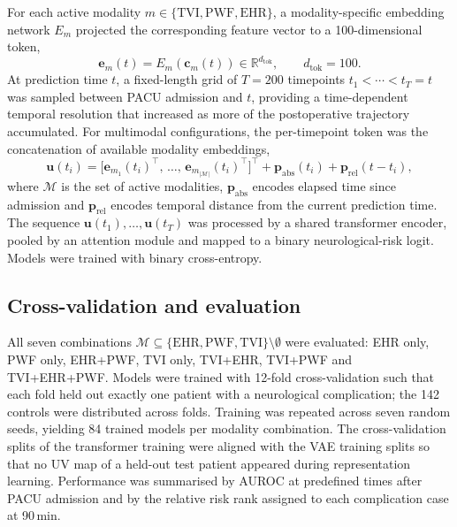 \documentclass[11pt]{article}
\begin{document}
For each active modality $m\in\{\mathrm{TVI},\mathrm{PWF},\mathrm{EHR}\}$, a modality-specific embedding network $E_{m}$ projected the corresponding feature vector to a 100-dimensional token,
\begin{equation}
  \label{eq:embed}
  \mathbf{e}_{m}(t)=E_{m}\!\left(\mathbf{c}_{m}(t)\right)\in\mathbb{R}^{d_{\mathrm{tok}}},\qquad d_{\mathrm{tok}}=100.
\end{equation}
At prediction time $t$, a fixed-length grid of $T=200$ timepoints $t_{1}<\cdots<t_{T}=t$ was sampled between PACU admission and $t$, providing a time-dependent temporal resolution that increased as more of the postoperative trajectory accumulated. For multimodal configurations, the per-timepoint token was the concatenation of available modality embeddings,
\begin{equation}
  \label{eq:token}
  \mathbf{u}(t_{i})=\bigl[\mathbf{e}_{m_{1}}(t_{i})^{\top},\,\ldots,\,\mathbf{e}_{m_{|\mathcal{M}|}}(t_{i})^{\top}\bigr]^{\top}+\mathbf{p}_{\mathrm{abs}}(t_{i})+\mathbf{p}_{\mathrm{rel}}(t-t_{i}),
\end{equation}
where $\mathcal{M}$ is the set of active modalities, $\mathbf{p}_{\mathrm{abs}}$ encodes elapsed time since admission and $\mathbf{p}_{\mathrm{rel}}$ encodes temporal distance from the current prediction time. The sequence $\mathbf{u}(t_{1}),\ldots,\mathbf{u}(t_{T})$ was processed by a shared transformer encoder, pooled by an attention module and mapped to a binary neurological-risk logit. Models were trained with binary cross-entropy.

\subsection*{Cross-validation and evaluation}

All seven combinations $\mathcal{M}\subseteq\{\mathrm{EHR},\mathrm{PWF},\mathrm{TVI}\}\setminus\emptyset$ were evaluated: EHR only, PWF only, EHR+PWF, TVI only, TVI+EHR, TVI+PWF and TVI+EHR+PWF. Models were trained with 12-fold cross-validation such that each fold held out exactly one patient with a neurological complication; the 142 controls were distributed across folds. Training was repeated across seven random seeds, yielding 84 trained models per modality combination. The cross-validation splits of the transformer training were aligned with the VAE training splits so that no UV map of a held-out test patient appeared during representation learning. Performance was summarised by AUROC at predefined times after PACU admission and by the relative risk rank assigned to each complication case at 90\,min.
\end{document}
